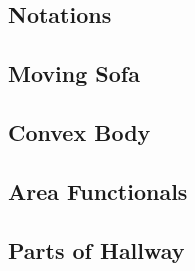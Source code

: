 
\subsection{Notations}
\label{sec:notations}


\subsection{Moving Sofa}
\label{sec:moving-sofa}


\subsection{Convex Body}
\label{sec:convex-body}


\subsection{Area Functionals}
\label{sec:area-functionals}


\subsection{Parts of Hallway}
\label{sec:parts-of-hallway}


